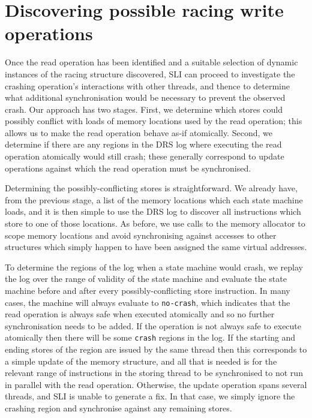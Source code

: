\documentclass[10pt,twocolumn,preprint,natbib,authoryear]{sigplanconf}
\begin{document}
\section{Discovering possible racing write operations}
\label{sect:multi_threading}

Once the read operation has been identified and a suitable selection
of dynamic instances of the racing structure discovered, SLI can
proceed to investigate the crashing operation's interactions with
other threads, and thence to determine what additional synchronisation
would be necessary to prevent the observed crash.  Our approach has
two stages.  First, we determine which stores could possibly conflict
with loads of memory locations used by the read operation; this allows
us to make the read operation behave as-if atomically.  Second, we
determine if there are any regions in the DRS log where executing the
read operation atomically would still crash; these generally
correspond to update operations against which the read operation must
be synchronised.

Determining the possibly-conflicting stores is straightforward.  We
already have, from the previous stage, a list of the memory locations
which each state machine loads, and it is then simple to use the DRS
log to discover all instructions which store to one of those
locations.  As before, we use calls to the memory allocator to scope
memory locations and avoid synchronising against accesses to other
structures which simply happen to have been assigned the same virtual
addresses.

To determine the regions of the log when a state machine would crash,
we replay the log over the range of validity of the state machine and
evaluate the state machine before and after every possibly-conflicting
store instruction.  In many cases, the machine will always evaluate to
\verb|no-crash|, which indicates that the read operation is always
safe when executed atomically and so no further synchronisation needs
to be added.  If the operation is not always safe to execute
atomically then there will be some \verb|crash| regions in the log.
If the starting and ending stores of the region are issued by the same
thread then this corresponds to a simple update of the memory
structure, and all that is needed is for the relevant range of
instructions in the storing thread to be synchronised to not run in
parallel with the read operation.  Otherwise, the update operation
spans several threads, and SLI is unable to generate a fix.  In that
case, we simply ignore the crashing region and synchronise against any
remaining stores.
\end{document}
